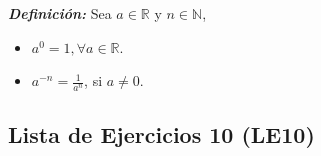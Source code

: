 \documentclass[11pt]{article}
\newcommand{\N}{\mathbb{N}}
\newcommand{\Z}{\mathbb{Z}}
\newcommand{\R}{\mathbb{R}}
\newcommand{\bfit}[1]{\textbf{\textit{#1}}}
\begin{document}


\bfit{Definición:} Sea $a\in \R$ y $n\in \N$, \begin{itemize}
  \item $a^0=1, \forall a\in \R$.
  \item $a^{-n}=\frac{1}{a^n}$, si $a\neq 0$.
\end{itemize}

 \subsection*{Lista de Ejercicios 10 (LE10)}
\end{document}
